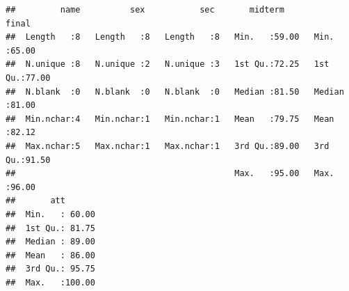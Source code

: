 \documentclass[
]{article}
\newenvironment{Shaded}{\begin{snugshade}}{\end{snugshade}}
\newcommand{\DecValTok}[1]{\textcolor[rgb]{0.00,0.00,0.81}{#1}}
\newcommand{\FunctionTok}[1]{\textcolor[rgb]{0.13,0.29,0.53}{\textbf{#1}}}
\newcommand{\NormalTok}[1]{#1}
\newcommand{\OtherTok}[1]{\textcolor[rgb]{0.56,0.35,0.01}{#1}}
\newcommand{\SpecialCharTok}[1]{\textcolor[rgb]{0.81,0.36,0.00}{\textbf{#1}}}
\newcommand{\StringTok}[1]{\textcolor[rgb]{0.31,0.60,0.02}{#1}}
\begin{document}
\begin{verbatim}
##         name          sex           sec       midterm          final      
##  Length   :8   Length   :8   Length   :8   Min.   :59.00   Min.   :65.00  
##  N.unique :8   N.unique :2   N.unique :3   1st Qu.:72.25   1st Qu.:77.00  
##  N.blank  :0   N.blank  :0   N.blank  :0   Median :81.50   Median :81.00  
##  Min.nchar:4   Min.nchar:1   Min.nchar:1   Mean   :79.75   Mean   :82.12  
##  Max.nchar:5   Max.nchar:1   Max.nchar:1   3rd Qu.:89.00   3rd Qu.:91.50  
##                                            Max.   :95.00   Max.   :96.00  
##       att        
##  Min.   : 60.00  
##  1st Qu.: 81.75  
##  Median : 89.00  
##  Mean   : 86.00  
##  3rd Qu.: 95.75  
##  Max.   :100.00
\end{verbatim}

\begin{Shaded}
\end{Shaded}

\begin{Shaded}
\end{Shaded}

\begin{Shaded}
\end{Shaded}
\end{document}

